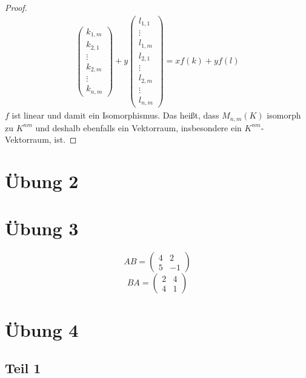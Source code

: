 \documentclass[a4paper,10pt]{article}
\begin{document}
\begin{proof}
\begin{align}
\begin{pmatrix}
       k_{1,m}\\
       k_{2,1}\\
       \vdots\\
       k_{2,m}\\
       \vdots\\
       k_{n,m}
      \end{pmatrix}
    + y\begin{pmatrix}
       l_{1,1}\\
       \vdots\\
       l_{1,m}\\
       l_{2,1}\\
       \vdots\\
       l_{2,m}\\
       \vdots\\
       l_{n,m}
      \end{pmatrix} = xf(k) + yf(l)
 \end{align}
 $f$ ist linear und damit ein Isomorphismus.
 Das heißt, dass $M_{n,m}(K)$ isomorph zu $K^{nm}$ und deshalb ebenfalls ein Vektorraum, insbesondere ein $K^{nm}$-Vektorraum, ist.
\end{proof}

\section*{Übung 2}

\section*{Übung 3}

\begin{equation}
 AB = \begin{pmatrix}
       4 & 2\\
       5 & -1
      \end{pmatrix}
\end{equation}
\begin{equation}
 BA = \begin{pmatrix}
       2 & 4\\
       4 & 1
      \end{pmatrix}
\end{equation}

\section*{Übung 4}

\subsection*{Teil 1}
\end{document}
